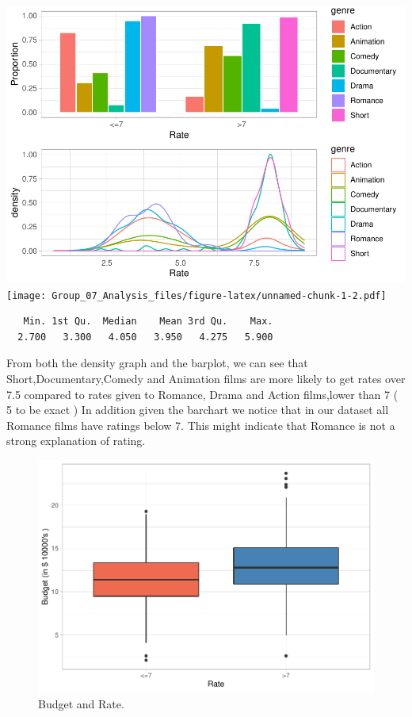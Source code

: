 \documentclass[
]{article}
\begin{document}
\includegraphics{Group_07_Analysis_files/figure-latex/unnamed-chunk-1-1.pdf}
\texttt{[image: Group\_07\_Analysis\_files/figure-latex/unnamed-chunk-1-2.pdf]}

\begin{verbatim}
   Min. 1st Qu.  Median    Mean 3rd Qu.    Max. 
  2.700   3.300   4.050   3.950   4.275   5.900 
\end{verbatim}

From both the density graph and the barplot, we can see that
Short,Documentary,Comedy and Animation films are more likely to get
rates over 7.5 compared to rates given to Romance, Drama and Action
films,lower than 7 ( 5 to be exact ) In addition given the barchart we
notice that in our dataset all Romance films have ratings below 7. This
might indicate that Romance is not a strong explanation of rating.

\begin{figure}[H]

{\centering \includegraphics[width=0.68\linewidth]{Group_07_Analysis_files/figure-latex/budget-1} 

}

\caption{\label{fig:budget} Budget and Rate.}\label{fig:budget}
\end{figure}
\end{document}

